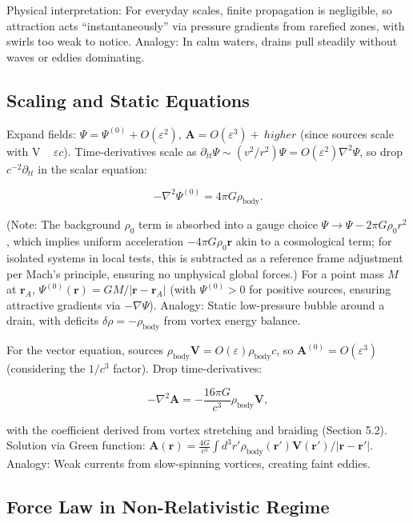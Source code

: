 \documentclass{article}
\begin{document}
Physical interpretation: For everyday scales, finite propagation is negligible, so attraction acts ``instantaneously'' via pressure gradients from rarefied zones, with swirls too weak to notice. Analogy: In calm waters, drains pull steadily without waves or eddies dominating.

\subsection{Scaling and Static Equations}

Expand fields: $\Psi = \Psi^{(0)} + O(\varepsilon^2)$, $\mathbf{A} = O(\varepsilon^3) + \ higher$ (since sources scale with V ~ $\varepsilon c$). Time-derivatives scale as $\partial_{tt} \Psi \sim (v^2 / r^2) \Psi = O(\varepsilon^2) \nabla^2 \Psi$, so drop $c^{-2} \partial_{tt}$ in the scalar equation:

\[
- \nabla^2 \Psi^{(0)} = 4\pi G \rho_{\text{body}}.
\]

(Note: The background $\rho_0$ term is absorbed into a gauge choice $\Psi \to \Psi - 2\pi G \rho_0 r^2$, which implies uniform acceleration $-4\pi G \rho_0 \mathbf{r}$ akin to a cosmological term; for isolated systems in local tests, this is subtracted as a reference frame adjustment per Mach's principle, ensuring no unphysical global forces.) For a point mass $M$ at $\mathbf{r}_A$, $\Psi^{(0)}(\mathbf{r}) = GM / |\mathbf{r} - \mathbf{r}_A|$ (with $\Psi^{(0)} > 0$ for positive sources, ensuring attractive gradients via $-\nabla \Psi$). Analogy: Static low-pressure bubble around a drain, with deficits $\delta \rho = -\rho_{\text{body}}$ from vortex energy balance.

For the vector equation, sources $\rho_{\text{body}} \mathbf{V} = O(\varepsilon) \rho_{\text{body}} c$, so $\mathbf{A}^{(0)} = O(\varepsilon^3)$ (considering the $1/c^3$ factor). Drop time-derivatives:

\[
- \nabla^2 \mathbf{A} = -\frac{16\pi G}{c^3} \rho_{\text{body}} \mathbf{V},
\]

with the coefficient derived from vortex stretching and braiding (Section 5.2). Solution via Green function: $\mathbf{A}(\mathbf{r}) = \frac{4 G}{c^3} \int d^3 r' \rho_{\text{body}}(\mathbf{r}') \mathbf{V}(\mathbf{r}') / |\mathbf{r} - \mathbf{r}'|$. Analogy: Weak currents from slow-spinning vortices, creating faint eddies.

\subsection{Force Law in Non-Relativistic Regime}
\end{document}
